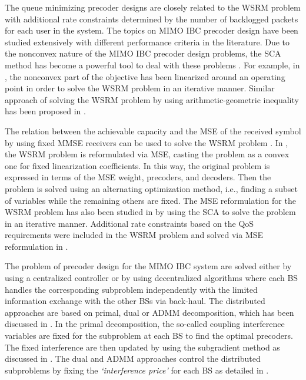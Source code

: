 The queue minimizing precoder designs are closely related to the \ac{WSRM} problem with additional rate constraints determined by the number of backlogged packets for each user in the system. The topics on \ac{MIMO} \ac{IBC} precoder design have been studied extensively with different performance criteria in the literature. Due to the nonconvex nature of the \ac{MIMO} \ac{IBC} precoder design problems, the \ac{SCA} method has become a powerful tool to deal with these problems \cite{bertsekas1999nonlinear}. For example, in \cite{sin_algorithm}, the nonconvex part of the objective has been linearized around an operating point in order to solve the \ac{WSRM} problem in an iterative manner. Similar approach of solving the \ac{WSRM} problem by using arithmetic-geometric inequality has been proposed in \cite{tran2012fast}.

The relation between the achievable capacity and the \ac{MSE} of the received symbol by using fixed \ac{MMSE} receivers can be used to solve the \ac{WSRM} problem \cite{mse_duality}. In \cite{christensen2008weighted,wmmse_shi}, the \ac{WSRM} problem is reformulated via \ac{MSE}, casting the problem as a convex one for fixed linearization coefficients. In this way, the original problem is expressed in terms of the \ac{MSE} weight, precoders, and decoders. Then the problem is solved using an alternating optimization method, i.e., finding a subset of variables while the remaining others are fixed. The \ac{MSE} reformulation for the \ac{WSRM} problem has also been studied in \cite{hong2012decomposition} by using the \ac{SCA} to solve the problem in an iterative manner. Additional rate constraints based on the \ac{QoS} requirements were included in the \ac{WSRM} problem and solved via \ac{MSE} reformulation in \cite{kaleva2013primal,kaleva2013decentralized}.

The problem of precoder design for the \ac{MIMO} \ac{IBC} system are solved either by using a centralized controller or by using decentralized algorithms where each \ac{BS} handles the corresponding subproblem independently with the limited information exchange with the other \acp{BS} via back-haul. The distributed approaches are based on primal, dual or \ac{ADMM} decomposition, which has been discussed in \cite{palomar2006tutorial,boyd2011distributed}. In the  primal decomposition, the so-called coupling interference variables are fixed for the subproblem at each \ac{BS} to find the optimal precoders. The fixed interference are then updated by using the subgradient method as discussed in \cite{pennanen2011decentralized}. The dual and \ac{ADMM} approaches control the distributed subproblems by fixing the \emph{`interference price'} for each \ac{BS} as detailed in \cite{tolli2011decentralized}.


